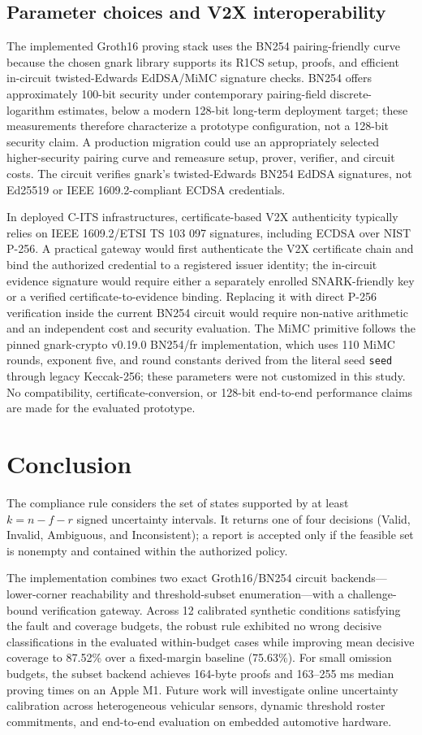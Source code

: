 \subsection{Parameter choices and V2X interoperability}
The implemented Groth16 proving stack uses the BN254 pairing-friendly curve because the chosen gnark library supports its R1CS setup, proofs, and efficient in-circuit twisted-Edwards EdDSA/MiMC signature checks. BN254 offers approximately 100-bit security under contemporary pairing-field discrete-logarithm estimates, below a modern 128-bit long-term deployment target; these measurements therefore characterize a prototype configuration, not a 128-bit security claim. A production migration could use an appropriately selected higher-security pairing curve and remeasure setup, prover, verifier, and circuit costs. The circuit verifies gnark's twisted-Edwards BN254 EdDSA signatures, not Ed25519 or IEEE 1609.2-compliant ECDSA credentials.

In deployed C-ITS infrastructures, certificate-based V2X authenticity typically relies on IEEE 1609.2/ETSI TS 103 097 signatures, including ECDSA over NIST P-256. A practical gateway would first authenticate the V2X certificate chain and bind the authorized credential to a registered issuer identity; the in-circuit evidence signature would require either a separately enrolled SNARK-friendly key or a verified certificate-to-evidence binding. Replacing it with direct P-256 verification inside the current BN254 circuit would require non-native arithmetic and an independent cost and security evaluation. The MiMC primitive follows the pinned gnark-crypto v0.19.0 BN254/fr implementation, which uses 110 MiMC rounds, exponent five, and round constants derived from the literal seed \texttt{seed} through legacy Keccak-256; these parameters were not customized in this study. No compatibility, certificate-conversion, or 128-bit end-to-end performance claims are made for the evaluated prototype.

\section{Conclusion}
The compliance rule considers the set of states supported by at least $k = n - f - r$ signed uncertainty intervals. It returns one of four decisions (Valid, Invalid, Ambiguous, and Inconsistent); a report is accepted only if the feasible set is nonempty and contained within the authorized policy.

The implementation combines two exact Groth16/BN254 circuit backends---lower-corner reachability and threshold-subset enumeration---with a challenge-bound verification gateway. Across 12 calibrated synthetic conditions satisfying the fault and coverage budgets, the robust rule exhibited no wrong decisive classifications in the evaluated within-budget cases while improving mean decisive coverage to 87.52\% over a fixed-margin baseline (75.63\%). For small omission budgets, the subset backend achieves 164-byte proofs and 163--255 ms median proving times on an Apple M1. Future work will investigate online uncertainty calibration across heterogeneous vehicular sensors, dynamic threshold roster commitments, and end-to-end evaluation on embedded automotive hardware.
